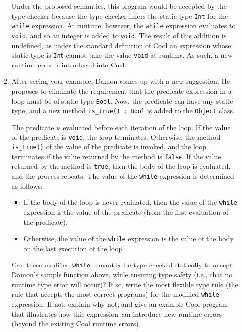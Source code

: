 \documentclass[11pt]{article}
\begin{document}
\begin{enumerate}
\begin{enumerate}
Under the proposed semantics, this program would be accepted by the
type checker because the type checker infers the static type
\texttt{Int} for the \texttt{while} expression.  At runtime, however,
the \texttt{while} expression evaluates to \texttt{void}, and so an
integer is added to \texttt{void}.  The result of this addition is
undefined, as under the standard definition of Cool an expression
whose static type is \texttt{Int} cannot take the value \texttt{void}
at runtime.  As such, a new runtime error is introduced into Cool.

\item After seeing your example, Damon comes up with a new suggestion.
He proposes to eliminate the requirement that the predicate expression
in a loop must be of static type \texttt{Bool}.  Now, the predicate
can have any static type, and a new method \texttt{is\_true() : Bool}
is added to the \texttt{Object} class.

The predicate is evaluated before each iteration of the loop.  If the
value of the predicate is \texttt{void}, the loop terminates.
Otherwise, the method \texttt{is\_true()} of the value of the
predicate is invoked, and the loop terminates if the value returned by
the method is \texttt{false}.  If the value returned by the method is
\texttt{true}, then the body of the loop is evaluated, and the process
repeats.  The value of the \texttt{while} expression is determined as
follows:

\begin{itemize}
\item If the body of the loop is never evaluated, then the value of
the \texttt{while} expression is the value of the predicate (from the
first evaluation of the predicate).

\item Otherwise, the value of the \texttt{while} expression is the
value of the body on the last execution of the loop.
\end{itemize}

Can these modified \texttt{while} semantics be type checked statically
to accept Damon's sample function above, while ensuring type safety
(i.e., that no runtime type error will occur)?  If so, write the most
flexible type rule (the rule that accepts the most correct programs)
for the modified \texttt{while} expression.  If not, explain why not,
and give an example Cool program that illustrates how this expression
can introduce new runtime errors (beyond the existing Cool runtime
errors).


\end{enumerate}
\end{enumerate}
\end{document}
